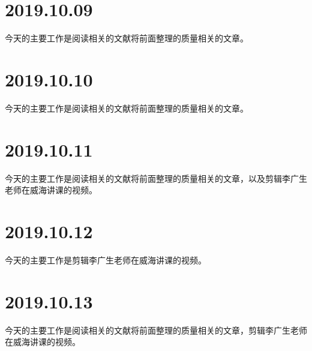 \section{2019.10.09}
今天的主要工作是阅读相关的文献将前面整理的质量相关的文章。

\section{2019.10.10}
今天的主要工作是阅读相关的文献将前面整理的质量相关的文章。

\section{2019.10.11}
今天的主要工作是阅读相关的文献将前面整理的质量相关的文章，以及剪辑李广生老师在威海讲课的视频。

\section{2019.10.12}
今天的主要工作是剪辑李广生老师在威海讲课的视频。

\section{2019.10.13}
今天的主要工作是阅读相关的文献将前面整理的质量相关的文章，剪辑李广生老师在威海讲课的视频。